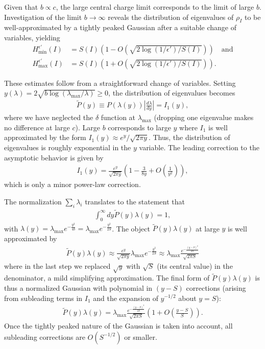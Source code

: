 \documentclass[12pt]{article}
\newcommand{\beq}{\begin{eqnarray}}
\newcommand{\eeq}{\end{eqnarray}}
\newcommand{\Hmax}{H_{\max}}
\newcommand{\Hmin}{H_{\min}}
\newcommand{\lamm}{\lambda_{\max}}
\begin{document}
Given that $b \propto c$, the large central charge limit corresponds to the limit of large $b$. Investigation of the limit $b \rightarrow \infty$ reveals the distribution of eigenvalues of $\rho_I$ to be well-approximated by a tightly peaked Gaussian after a suitable change of variables, yielding\begin{align} \label{eqn:smooths}
\Hmin^{\epsilon'}(I) &= S(I) \left( 1 - O\left( \sqrt{2  \log(1/\epsilon') / S(I)} \right) \right)
	\quad \text{and} \nonumber \\
\Hmax^{\epsilon'}(I) &= S(I) \left( 1 + O\left( \sqrt{2  \log( 1/\epsilon') / S(I)} \right) \right).
\end{align}

These estimates follow from a straightforward change of variables. Setting $y(\lambda) = 2 \sqrt{ b \log(\lamm/\lambda)} \geq 0$, the distribution of eigenvalues becomes
\beq
\tilde{P}(y) \equiv P(\lambda(y)) \left|\frac{d\lambda}{d y}\right| = I_1(y),
\eeq
where we have neglected the $\delta$ function at $\lamm$ (dropping one eigenvalue makes no difference at large $c$). Large $b$ corresponds to large $y$ where $I_1$ is well approximated by the form $I_1(y) \approx e^y/\sqrt{2 \pi y}$. Thus, the distribution of eigenvalues is roughly exponential in the $y$ variable. The leading correction to the asymptotic behavior is given by
\beq
I_1(y) = \frac{e^y}{\sqrt{2\pi y}}\left(1 - \frac{3}{8y} + O\left(\frac{1}{y^2}\right)\right),
\eeq
which is only a minor power-law correction.

The normalization $\sum_i \lambda_i$ translates to the statement that
\beq
\int_0^\infty dy \tilde{P}(y) \lambda(y) = 1,
\eeq
with $\lambda(y) = \lamm e^{-\frac{y^2}{4b}} = \lamm e^{-\frac{y^2}{2S}}$. The object $\tilde{P}(y) \lambda(y)$ at large $y$ is well approximated by
\beq
\tilde{P}(y) \lambda(y) \approx \frac{e^y}{\sqrt{2 \pi y}} \lamm e^{- \frac{y^2}{2S}} \approx \lamm \frac{e^{- \frac{(y-S)^2}{2S}}}{\sqrt{2 \pi S}}
\eeq
where in the last step we replaced $\sqrt{y}$ with $\sqrt{S}$ (its central value) in the denominator, a mild simplifying approximation. The final form of $\tilde{P}(y) \lambda(y)$ is thus a normalized Gaussian with polynomial in $(y-S)$ corrections (arising from subleading terms in $I_1$ and the expansion of $y^{-1/2}$ about $y=S$):
\beq
\tilde{P}(y)\lambda(y) = \lamm \frac{e^{- \frac{(y-S)^2}{2S}}}{\sqrt{2 \pi S}}\left(1 + O\left(\frac{y-S}{S}\right)\right).
\eeq
Once the tightly peaked nature of the Gaussian is taken into account, all subleading corrections are $O(S^{-1/2})$ or smaller.
\end{document}
